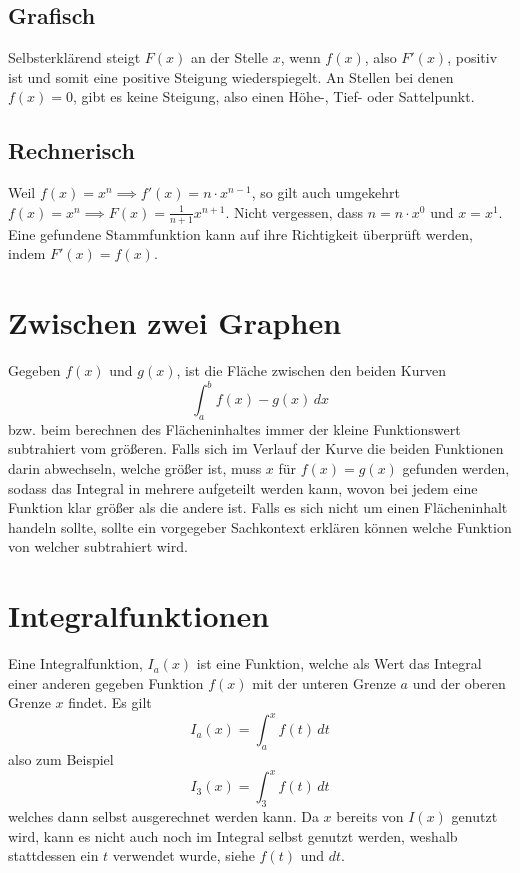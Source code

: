 \documentclass{article}
\begin{document}
\subsection{Grafisch}
Selbsterklärend steigt $F(x)$ an der Stelle $x$, wenn $f(x)$, also $F'(x)$, positiv ist und somit eine positive Steigung wiederspiegelt. An Stellen bei denen $f(x)=0$, gibt es keine Steigung, also einen Höhe-, Tief- oder Sattelpunkt.
 
\subsection{Rechnerisch}
Weil $f(x)=x^n \implies f'(x)=n \cdot x^{n-1}$, so gilt auch umgekehrt $f(x)=x^n \implies F(x)=\frac{1}{n+1}x^{n+1}$. Nicht vergessen, dass $n=n \cdot x^0$ und $x=x^1$. Eine gefundene Stammfunktion kann auf ihre Richtigkeit überprüft werden, indem $F'(x)=f(x)$.
 
\section{Zwischen zwei Graphen} 
Gegeben $f(x)$ und $g(x)$, ist die Fläche zwischen den beiden Kurven
\[\int_a^b f(x)-g(x) \,dx\]  
bzw. beim berechnen des Flächeninhaltes immer der kleine Funktionswert subtrahiert vom größeren. Falls sich im Verlauf der Kurve die beiden Funktionen darin abwechseln, welche größer ist, muss $x$ für $f(x)=g(x)$ gefunden werden, sodass das Integral in mehrere aufgeteilt werden kann, wovon bei jedem eine Funktion klar größer als die andere ist. \newline
Falls es sich nicht um einen Flächeninhalt handeln sollte, sollte ein vorgegeber Sachkontext erklären können welche Funktion von welcher subtrahiert wird.
 
\section{Integralfunktionen}
Eine Integralfunktion, $I_a(x)$ ist eine Funktion, welche als Wert das Integral einer anderen gegeben Funktion $f(x)$ mit der unteren Grenze $a$ und der oberen Grenze $x$ findet. Es gilt 
\[I_a(x)=\int_a^x f(t) \,dt\]
also zum Beispiel
\[I_3(x)=\int_3^x f(t) \,dt\]
welches dann selbst ausgerechnet werden kann. \newline
Da $x$ bereits von $I(x)$ genutzt wird, kann es nicht auch noch im Integral selbst genutzt werden, weshalb stattdessen ein $t$ verwendet wurde, siehe $f(t)$ und $dt$.
 
\end{document}

